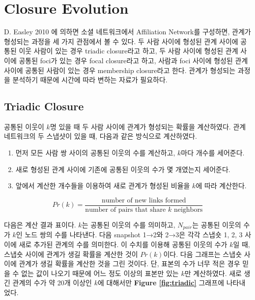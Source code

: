 \documentclass[10pt, a4paper, titlepage]{article}
\begin{document}
\section{Closure Evolution}

D. Easley  2010 \cite{r2}에 의하면 소셜 네트워크에서 Affiliation Network를 구성하면, 관계가 형성되는 과정을 세 가지 관점에서 볼 수 있다. 두 사람 사이에 형성된 관계 사이에 공통된 이웃 사람이 있는 경우 triadic closure라고 하고, 두 사람 사이에 형성된 관계 사이에 공통된 foci가 있는 경우 focal closure라고 하고, 사람과 foci 사이에 형성된 관계 사이에 공통된 사람이 있는 경우 membership closure라고 한다. 관계가 형성되는 과정을 분석하기 때문에 시간에 따라 변하는 자료가 필요하다. 


\subsection{Triadic Closure}

공통된 이웃이 $k$명 있을 때 두 사람 사이에 관계가 형성되는 확률을 계산하였다. 관계 네트워크의 두 스냅샷이 있을 때, 다음과 같은 방식으로 계산하였다.
\begin{enumerate}
\item 먼저 모든 사람 쌍 사이의 공통된 이웃의 수를 계산하고, $k$마다 개수를 세어준다.
\item 새로 형성된 관계 사이에 기존에 공통된 이웃의 수가 몇 개였는지 세어준다.
\item 앞에서 계산한 개수들을 이용하여 새로 관계가 형성된 비율을 $k$에 따라 계산한다.
\end{enumerate}

$$
Pr(k) = \frac{\textrm{number of new links formed}}{\textrm{number of pairs that share } k \textrm{ neighbors}}
$$

다음은 계산 결과 표이다. $k$는 공통된 이웃의 수를 의미하고, $N_{pair}$는 공통된 이웃의 수가 $k$인 노드 쌍의 수를 나타낸다. 다음 snapshot 1→2와 2→3은 각각 스냅숏 1, 2, 3 사이에 새로 추가된 관계의 수를 의미한다. 이 수치를 이용해  공통된 이웃의 수가 $k$일 때, 스냅숏 사이에 관계가 생길 확률을 계산한 것이 $Pr(k)$이다. 다음 그래프는 스냅숏 사이에 관계가 생길 확률을 계산한 것을 그린 것이다. 단, 표본의 수가 너무 적은 경우 믿을 수 없는 값이 나오기 때문에 어느 정도 이상의 표본만 있는 $k$만 계산하였다. 새로 생긴 관계의 수가 약 20개 이상인 $k$에 대해서만 {\bf Figure \ref{fig:triadic}} 그래프에 나타내었다. 
\end{document}
